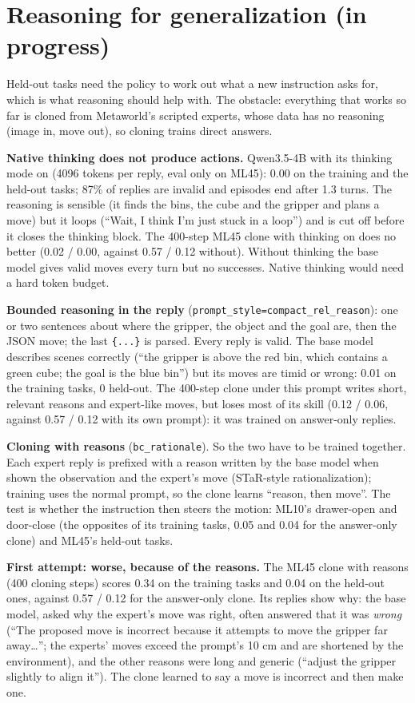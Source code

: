 \documentclass[11pt]{article}
\newcommand{\code}[1]{\texttt{#1}}
\begin{document}
\section{Reasoning for generalization (in progress)}
\label{sec:reasoning}
Held-out tasks need the policy to work out what a new instruction asks for, which is what reasoning should help with.
The obstacle: everything that works so far is cloned from Metaworld's scripted experts, whose data has no reasoning
(image in, move out), so cloning trains direct answers.

\textbf{Native thinking does not produce actions.} Qwen3.5-4B with its thinking mode on (4096 tokens per reply, eval only
on ML45): 0.00 on the training and the held-out tasks; 87\% of replies are invalid and episodes end after 1.3 turns. The
reasoning is sensible (it finds the bins, the cube and the gripper and plans a move) but it loops (``Wait, I think I'm
just stuck in a loop'') and is cut off before it closes the thinking block. The 400-step ML45 clone with thinking on does
no better (0.02 / 0.00, against 0.57 / 0.12 without). Without thinking the base model gives valid moves every turn but no
successes. Native thinking would need a hard token budget.

\textbf{Bounded reasoning in the reply} (\code{prompt\_style=compact\_rel\_reason}): one or two sentences about where the
gripper, the object and the goal are, then the JSON move; the last \code{\{...\}} is parsed. Every reply is valid. The base
model describes scenes correctly (``the gripper is above the red bin, which contains a green cube; the goal is the blue
bin'') but its moves are timid or wrong: 0.01 on the training tasks, 0 held-out. The 400-step clone under this prompt
writes short, relevant reasons and expert-like moves, but loses most of its skill (0.12 / 0.06, against 0.57 / 0.12
with its own prompt): it was trained on answer-only replies.

\textbf{Cloning with reasons} (\code{bc\_rationale}). So the two have to be trained together. Each expert reply is
prefixed with a reason written by the base model when shown the observation and the expert's move (STaR-style
rationalization); training uses the normal prompt, so the clone learns ``reason, then move''. The test is whether the
instruction then steers the motion: ML10's drawer-open and door-close (the opposites of its training tasks, 0.05 and
0.04 for the answer-only clone) and ML45's held-out tasks.

\textbf{First attempt: worse, because of the reasons.} The ML45 clone with reasons (400 cloning steps) scores 0.34 on the
training tasks and 0.04 on the held-out ones, against 0.57 / 0.12 for the answer-only clone. Its replies show why: the base
model, asked why the expert's move was right, often answered that it was \emph{wrong} (``The proposed move is incorrect
because it attempts to move the gripper far away\ldots''; the experts' moves exceed the prompt's 10 cm and are shortened
by the environment), and the other reasons were long and generic (``adjust the gripper slightly to align it''). The clone
learned to say a move is incorrect and then make one.
\end{document}
